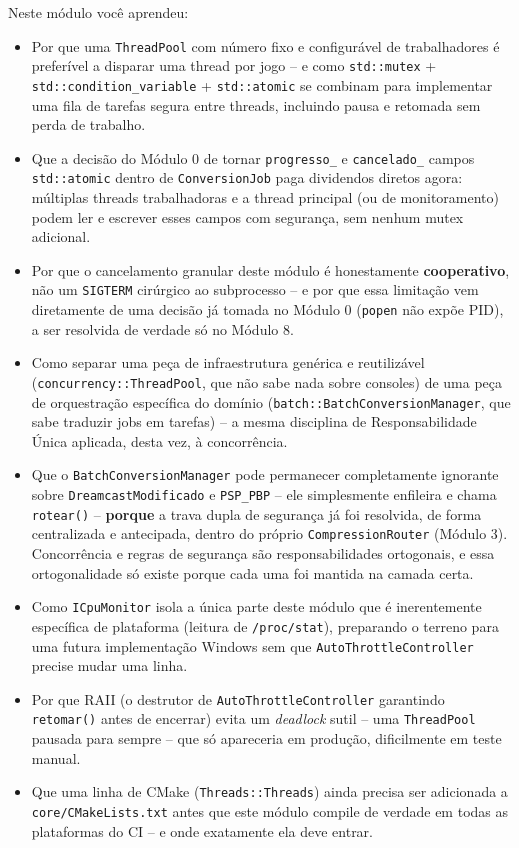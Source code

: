 \begin{CaixaResumo}
Neste módulo você aprendeu:
\begin{itemize}
    \item Por que uma \texttt{ThreadPool} com número fixo e configurável de trabalhadores é preferível a disparar uma thread por jogo -- e como \texttt{std::mutex} + \texttt{std::condition\_variable} + \texttt{std::atomic} se combinam para implementar uma fila de tarefas segura entre threads, incluindo pausa e retomada sem perda de trabalho.
    \item Que a decisão do Módulo 0 de tornar \texttt{progresso\_} e \texttt{cancelado\_} campos \texttt{std::atomic} dentro de \texttt{ConversionJob} paga dividendos diretos agora: múltiplas threads trabalhadoras e a thread principal (ou de monitoramento) podem ler e escrever esses campos com segurança, sem nenhum mutex adicional.
    \item Por que o cancelamento granular deste módulo é honestamente \textbf{cooperativo}, não um \texttt{SIGTERM} cirúrgico ao subprocesso -- e por que essa limitação vem diretamente de uma decisão já tomada no Módulo 0 (\texttt{popen} não expõe PID), a ser resolvida de verdade só no Módulo 8.
    \item Como separar uma peça de infraestrutura genérica e reutilizável (\texttt{concurrency::ThreadPool}, que não sabe nada sobre consoles) de uma peça de orquestração específica do domínio (\texttt{batch::BatchConversionManager}, que sabe traduzir jobs em tarefas) -- a mesma disciplina de Responsabilidade Única aplicada, desta vez, à concorrência.
    \item Que o \texttt{BatchConversionManager} pode permanecer completamente ignorante sobre \texttt{DreamcastModificado} e \texttt{PSP\_PBP} -- ele simplesmente enfileira e chama \texttt{rotear()} -- \textbf{porque} a trava dupla de segurança já foi resolvida, de forma centralizada e antecipada, dentro do próprio \texttt{CompressionRouter} (Módulo 3). Concorrência e regras de segurança são responsabilidades ortogonais, e essa ortogonalidade só existe porque cada uma foi mantida na camada certa.
    \item Como \texttt{ICpuMonitor} isola a única parte deste módulo que é inerentemente específica de plataforma (leitura de \texttt{/proc/stat}), preparando o terreno para uma futura implementação Windows sem que \texttt{AutoThrottleController} precise mudar uma linha.
    \item Por que RAII (o destrutor de \texttt{AutoThrottleController} garantindo \texttt{retomar()} antes de encerrar) evita um \textit{deadlock} sutil -- uma \texttt{ThreadPool} pausada para sempre -- que só apareceria em produção, dificilmente em teste manual.
    \item Que uma linha de CMake (\texttt{Threads::Threads}) ainda precisa ser adicionada a \texttt{core/CMakeLists.txt} antes que este módulo compile de verdade em todas as plataformas do CI -- e onde exatamente ela deve entrar.
\end{itemize}


\end{CaixaResumo}
